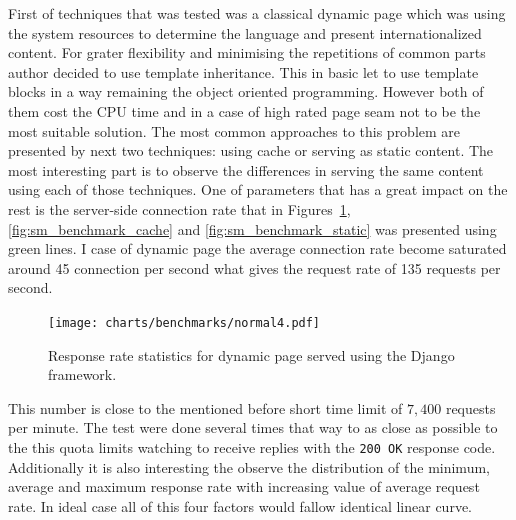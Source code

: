 First of techniques that was tested was a classical dynamic page which was using the system resources to determine the language and present internationalized content. For grater flexibility and minimising the repetitions of common parts author decided to use template inheritance. This in basic let to use template blocks in a way remaining the object oriented  programming. However both of them cost the CPU time and in a case of high rated page seam not to be the most suitable solution. The most common approaches to this problem are presented by next two techniques: using cache or serving as static content. The most interesting part is to observe the differences in serving the same content using each of those techniques. One of parameters that has a great impact on the  rest is the server-side connection rate that in Figures~\ref{fig:sm_benchmark_normal}, \ref{fig:sm_benchmark_cache} and \ref{fig:sm_benchmark_static} was presented using green lines. I case of dynamic page the average connection rate become saturated around 45 connection per second what gives the request rate of 135 requests per second. 
\begin{figure}[ht]
  \begin{center}
	\texttt{[image: charts/benchmarks/normal4.pdf]}
  \end{center}
  \caption{Response rate statistics for dynamic page served using the Django framework.}
	\label{fig:sm_benchmark_normal}
\end{figure}
This number is close to the mentioned before short time limit of $7, 400$ requests per minute. The test were done several times that way to as close as possible to the this quota limits watching to receive replies with the \texttt{200 OK} response code. Additionally it is also interesting the observe the distribution of the minimum, average and maximum response rate with increasing value of average request rate. In ideal case all of this four factors would fallow identical linear curve.     

